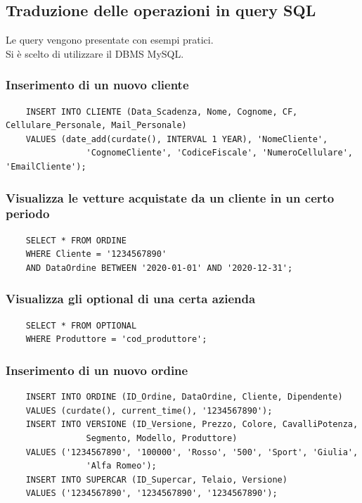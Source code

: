 \documentclass[12pt]{article}
\begin{document}
\subsection{Traduzione delle operazioni in query SQL}

Le query vengono presentate con esempi pratici.\\
Si è scelto di utilizzare il DBMS MySQL.

\lstset{style=sqlStyle}

\subsubsection*{Inserimento di un nuovo cliente}

\begin{lstlisting}
    INSERT INTO CLIENTE (Data_Scadenza, Nome, Cognome, CF, Cellulare_Personale, Mail_Personale)
    VALUES (date_add(curdate(), INTERVAL 1 YEAR), 'NomeCliente', 
                'CognomeCliente', 'CodiceFiscale', 'NumeroCellulare', 'EmailCliente');
\end{lstlisting}

\subsubsection*{Visualizza le vetture acquistate da un cliente in un
certo periodo}

\begin{lstlisting}
    SELECT * FROM ORDINE
    WHERE Cliente = '1234567890' 
    AND DataOrdine BETWEEN '2020-01-01' AND '2020-12-31';
\end{lstlisting}

\subsubsection*{Visualizza gli optional di una certa azienda}
\begin{lstlisting}
    SELECT * FROM OPTIONAL
    WHERE Produttore = 'cod_produttore';
\end{lstlisting}

\subsubsection*{Inserimento di un nuovo ordine}
\begin{lstlisting}
    INSERT INTO ORDINE (ID_Ordine, DataOrdine, Cliente, Dipendente)
    VALUES (curdate(), current_time(), '1234567890');
    INSERT INTO VERSIONE (ID_Versione, Prezzo, Colore, CavalliPotenza, 
                Segmento, Modello, Produttore)
    VALUES ('1234567890', '100000', 'Rosso', '500', 'Sport', 'Giulia', 
                'Alfa Romeo');
    INSERT INTO SUPERCAR (ID_Supercar, Telaio, Versione)
    VALUES ('1234567890', '1234567890', '1234567890');
\end{lstlisting}
\end{document}
